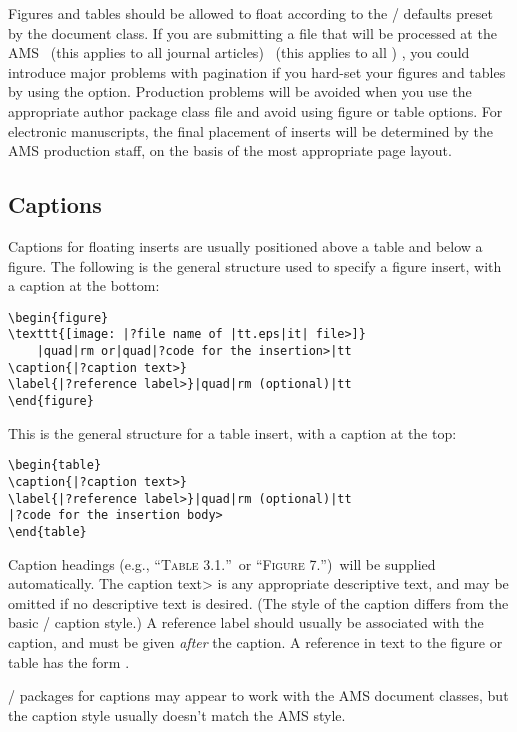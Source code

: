 Figures and tables should be allowed to float according to the \latex/
defaults preset by the document class.  If you are submitting a file
that will be processed at the AMS%
\ifjournal
 \ (this applies to all journal articles)%
\else \ifmemoirs
 \ (this applies to all \Memos)%
\fi \fi
, you could introduce major problems with pagination if you
hard-set your figures and tables by using the  option.
Production problems will be avoided when you use the appropriate
author package class file and avoid using figure or table options.
For electronic manuscripts, the final placement of inserts will be
determined by the AMS production staff, on the basis of the most
appropriate page layout.

\subsection{Captions}
Captions for floating inserts are usually positioned above a table and
below a figure. The following is the general structure used to specify
a figure insert, with a caption at the bottom:
\begin{verbatim}
\begin{figure}
\texttt{[image: |?file name of |tt.eps|it| file>]}
 	|quad|rm or|quad|?code for the insertion>|tt
\caption{|?caption text>}
\label{|?reference label>}|quad|rm (optional)|tt
\end{figure}
\end{verbatim}

This is the general structure for a table insert, with a caption at
the top:
\begin{verbatim}
\begin{table}
\caption{|?caption text>}
\label{|?reference label>}|quad|rm (optional)|tt
|?code for the insertion body>
\end{table}
\end{verbatim}

Caption headings (e.g., ``\textsc{Table 3.1.}''\ or
``\textsc{Figure 7.}'')\ will be supplied automatically.  The
\<caption text> is any appropriate descriptive text, and may be
omitted if no descriptive text is desired.  (The style of the caption
differs from the basic \latex/ caption style.)  A reference label
should usually be associated with the caption, and must be given
\emph{after} the caption.  A reference in text to the figure or table
has the form .

\latex/ packages for captions may appear to work with the AMS document
classes, but the caption style usually doesn't match the AMS style.


